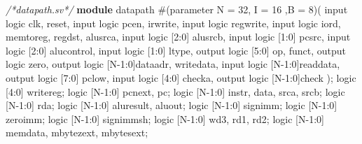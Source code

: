 \documentclass[]{article}
\newenvironment{Shaded}{}{}
\newcommand{\KeywordTok}[1]{\textcolor[rgb]{0.00,0.44,0.13}{\textbf{#1}}}
\newcommand{\DataTypeTok}[1]{\textcolor[rgb]{0.56,0.13,0.00}{#1}}
\newcommand{\DecValTok}[1]{\textcolor[rgb]{0.25,0.63,0.44}{#1}}
\newcommand{\CommentTok}[1]{\textcolor[rgb]{0.38,0.63,0.69}{\textit{#1}}}
\newcommand{\NormalTok}[1]{#1}
\begin{document}
\begin{Shaded}
\begin{Highlighting}[]
\CommentTok{/*datapath.sv*/}
\KeywordTok{module}\NormalTok{ datapath #(}\DataTypeTok{parameter}\NormalTok{ N = }\DecValTok{32}\NormalTok{, I = }\DecValTok{16}\NormalTok{ ,B = }\DecValTok{8}\NormalTok{)(}
    \DataTypeTok{input}\NormalTok{   logic       clk, reset,}
    \DataTypeTok{input}\NormalTok{   logic       pcen, irwrite,}
    \DataTypeTok{input}\NormalTok{   logic       regwrite,}
    \DataTypeTok{input}\NormalTok{   logic       iord, memtoreg, regdst, alusrca, }
    \DataTypeTok{input}\NormalTok{   logic [}\DecValTok{2}\NormalTok{:}\DecValTok{0}\NormalTok{] alusrcb,}
    \DataTypeTok{input}\NormalTok{   logic [}\DecValTok{1}\NormalTok{:}\DecValTok{0}\NormalTok{] pcsrc,}
    \DataTypeTok{input}\NormalTok{   logic [}\DecValTok{2}\NormalTok{:}\DecValTok{0}\NormalTok{] alucontrol,}
    \DataTypeTok{input}\NormalTok{   logic [}\DecValTok{1}\NormalTok{:}\DecValTok{0}\NormalTok{] ltype,}
    \DataTypeTok{output}\NormalTok{  logic [}\DecValTok{5}\NormalTok{:}\DecValTok{0}\NormalTok{] op, funct,}
    \DataTypeTok{output}\NormalTok{  logic       zero,}
    \DataTypeTok{output}\NormalTok{  logic [N-}\DecValTok{1}\NormalTok{:}\DecValTok{0}\NormalTok{]dataadr, writedata,}
    \DataTypeTok{input}\NormalTok{   logic [N-}\DecValTok{1}\NormalTok{:}\DecValTok{0}\NormalTok{]readdata,}
    \DataTypeTok{output}\NormalTok{  logic [}\DecValTok{7}\NormalTok{:}\DecValTok{0}\NormalTok{]  pclow,}
    \DataTypeTok{input}\NormalTok{   logic [}\DecValTok{4}\NormalTok{:}\DecValTok{0}\NormalTok{]  checka,}
    \DataTypeTok{output}\NormalTok{  logic [N-}\DecValTok{1}\NormalTok{:}\DecValTok{0}\NormalTok{]check}
\NormalTok{);}
\NormalTok{    logic [}\DecValTok{4}\NormalTok{:}\DecValTok{0}\NormalTok{]     writereg;}
\NormalTok{    logic [N-}\DecValTok{1}\NormalTok{:}\DecValTok{0}\NormalTok{]   pcnext, pc;}
\NormalTok{    logic [N-}\DecValTok{1}\NormalTok{:}\DecValTok{0}\NormalTok{]   instr, data, srca, srcb;}
\NormalTok{    logic [N-}\DecValTok{1}\NormalTok{:}\DecValTok{0}\NormalTok{]   rda;}
\NormalTok{    logic [N-}\DecValTok{1}\NormalTok{:}\DecValTok{0}\NormalTok{]   aluresult, aluout;}
\NormalTok{    logic [N-}\DecValTok{1}\NormalTok{:}\DecValTok{0}\NormalTok{]   signimm; }
\NormalTok{    logic [N-}\DecValTok{1}\NormalTok{:}\DecValTok{0}\NormalTok{]   zeroimm; }
\NormalTok{    logic [N-}\DecValTok{1}\NormalTok{:}\DecValTok{0}\NormalTok{]   signimmsh; }
\NormalTok{    logic [N-}\DecValTok{1}\NormalTok{:}\DecValTok{0}\NormalTok{]   wd3, rd1, rd2;}
\NormalTok{    logic [N-}\DecValTok{1}\NormalTok{:}\DecValTok{0}\NormalTok{]   memdata, mbytezext, mbytesext; }

\end{Highlighting}
\end{Shaded}
\end{document}
